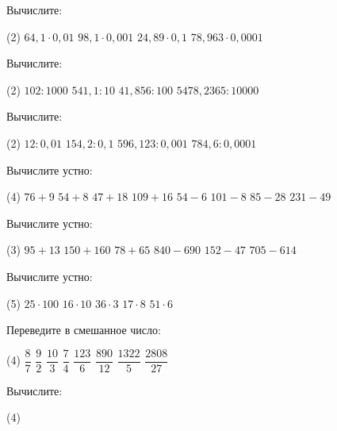 %

\begin{class}[number=1]
	\begin{listofex}
		\item Вычислите:
		\begin{tasks}(2)
			\task \( 64,1\cdot0,01 \)
			\task \( 98,1\cdot0,001 \)
			\task \( 24,89\cdot0,1 \)
			\task \( 78,963\cdot0,0001 \)
		\end{tasks}
		\item Вычислите:
		\begin{tasks}(2)
			\task \( 102:1000 \)
			\task \( 541,1:10 \)
			\task \( 41,856:100 \)
			\task \( 5478,2365:10000 \)
		\end{tasks}
		\item Вычислите:
		\begin{tasks}(2)
			\task \( 12:0,01 \)
			\task \( 154,2:0,1 \)
			\task \( 596,123:0,001 \)
			\task \( 784,6:0,0001 \)
		\end{tasks}
		\item Вычислите устно:
		\begin{tasks}(4)
			\task \( 76+9 \)
			\task \( 54+8 \)
			\task \( 47+18 \)
			\task \( 109+16 \)
			\task \( 54-6 \)
			\task \( 101-8 \)
			\task \( 85-28 \)
			\task \( 231-49 \)
		\end{tasks}
		\item Вычислите устно:
		\begin{tasks}(3)
			\task \( 95+13 \)
			\task \( 150+160 \)
			\task \( 78+65 \)
			\task \( 840-690 \)
			\task \( 152-47 \)
			\task \( 705-614 \)
		\end{tasks}
		\item Вычислите устно:
		\begin{tasks}(5)
			\task \( 25\cdot100 \)
			\task \( 16\cdot10 \)
			\task \( 36\cdot3 \)
			\task \( 17\cdot8 \)
			\task \( 51\cdot6 \)
		\end{tasks}
		\item Переведите в смешанное число:
		\begin{tasks}(4)
			\task \( \dfrac{8}{7} \)
			\task \( \dfrac{9}{2} \)
			\task \( \dfrac{10}{3} \)
			\task \( \dfrac{7}{4} \)
			\task \( \dfrac{123}{6} \)
			\task \( \dfrac{890}{12} \)
			\task \( \dfrac{1322}{5} \)
			\task \( \dfrac{2808}{27} \)
		\end{tasks}
		\item Вычислите:
		\begin{tasks}(4)

\end{tasks}
\end{listofex}
\end{class}
